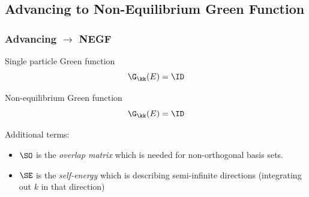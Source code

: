 \subsection{Advancing to Non-Equilibrium Green Function}

\begin{frame}
  \frametitle{Advancing $\to$ NEGF}

  \begin{block}{Single particle Green function}
    \begin{equation*}
      [(E+\im\eta)\ID - \HH_\kk]\G_\kk(E) = \ID
    \end{equation*}
  \end{block}

  \begin{block}{Non-equilibrium Green function}
    \begin{equation*}
      [(E+\im\eta)\SO - \HH_\kk - \sum_\idxE \SE_{\idxE,\kk}(E-\mu_\idxE)]\G_\kk(E) = \ID
    \end{equation*}

    Additional terms:
    \begin{itemize}
      \item%
      $\SO$ is the \emph{overlap matrix} which is needed for non-orthogonal basis sets.

      \item%
      $\SE$ is the \emph{self-energy} which is describing semi-infinite directions
      (integrating out $k$ in that direction)

    \begin{center}

      \begin{columns}

\end{columns}
\end{center}
\end{itemize}
\end{block}
\end{frame}
